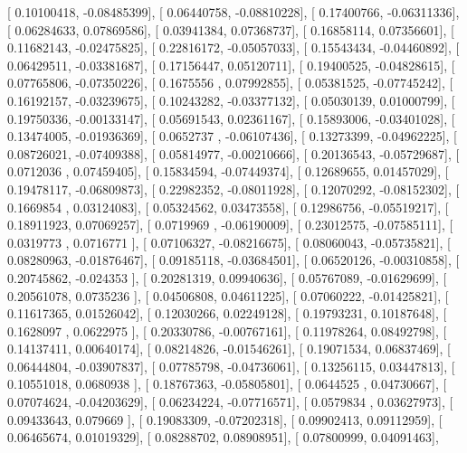 \documentclass{article}
\begin{document}
       [ 0.10100418, -0.08485399],
       [ 0.06440758, -0.08810228],
       [ 0.17400766, -0.06311336],
       [ 0.06284633,  0.07869586],
       [ 0.03941384,  0.07368737],
       [ 0.16858114,  0.07356601],
       [ 0.11682143, -0.02475825],
       [ 0.22816172, -0.05057033],
       [ 0.15543434, -0.04460892],
       [ 0.06429511, -0.03381687],
       [ 0.17156447,  0.05120711],
       [ 0.19400525, -0.04828615],
       [ 0.07765806, -0.07350226],
       [ 0.1675556 ,  0.07992855],
       [ 0.05381525, -0.07745242],
       [ 0.16192157, -0.03239675],
       [ 0.10243282, -0.03377132],
       [ 0.05030139,  0.01000799],
       [ 0.19750336, -0.00133147],
       [ 0.05691543,  0.02361167],
       [ 0.15893006, -0.03401028],
       [ 0.13474005, -0.01936369],
       [ 0.0652737 , -0.06107436],
       [ 0.13273399, -0.04962225],
       [ 0.08726021, -0.07409388],
       [ 0.05814977, -0.00210666],
       [ 0.20136543, -0.05729687],
       [ 0.0712036 ,  0.07459405],
       [ 0.15834594, -0.07449374],
       [ 0.12689655,  0.01457029],
       [ 0.19478117, -0.06809873],
       [ 0.22982352, -0.08011928],
       [ 0.12070292, -0.08152302],
       [ 0.1669854 ,  0.03124083],
       [ 0.05324562,  0.03473558],
       [ 0.12986756, -0.05519217],
       [ 0.18911923,  0.07069257],
       [ 0.0719969 , -0.06190009],
       [ 0.23012575, -0.07585111],
       [ 0.0319773 ,  0.0716771 ],
       [ 0.07106327, -0.08216675],
       [ 0.08060043, -0.05735821],
       [ 0.08280963, -0.01876467],
       [ 0.09185118, -0.03684501],
       [ 0.06520126, -0.00310858],
       [ 0.20745862, -0.024353  ],
       [ 0.20281319,  0.09940636],
       [ 0.05767089, -0.01629699],
       [ 0.20561078,  0.0735236 ],
       [ 0.04506808,  0.04611225],
       [ 0.07060222, -0.01425821],
       [ 0.11617365,  0.01526042],
       [ 0.12030266,  0.02249128],
       [ 0.19793231,  0.10187648],
       [ 0.1628097 ,  0.0622975 ],
       [ 0.20330786, -0.00767161],
       [ 0.11978264,  0.08492798],
       [ 0.14137411,  0.00640174],
       [ 0.08214826, -0.01546261],
       [ 0.19071534,  0.06837469],
       [ 0.06444804, -0.03907837],
       [ 0.07785798, -0.04736061],
       [ 0.13256115,  0.03447813],
       [ 0.10551018,  0.0680938 ],
       [ 0.18767363, -0.05805801],
       [ 0.0644525 ,  0.04730667],
       [ 0.07074624, -0.04203629],
       [ 0.06234224, -0.07716571],
       [ 0.0579834 ,  0.03627973],
       [ 0.09433643,  0.079669  ],
       [ 0.19083309, -0.07202318],
       [ 0.09902413,  0.09112959],
       [ 0.06465674,  0.01019329],
       [ 0.08288702,  0.08908951],
       [ 0.07800999,  0.04091463],
\end{document}
